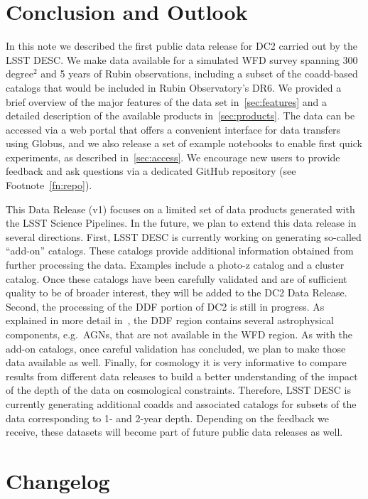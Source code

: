 \documentclass[modern]{descnote}
\begin{document}
\section{Conclusion and Outlook}
\label{sec:outlook}
In this note we described the first public data release for DC2 carried out by the LSST DESC. We make data available for a simulated WFD survey spanning 300 degree$^2$ and 5 years of Rubin observations, including a subset of the coadd-based catalogs that would be included in Rubin Observatory's DR6. We provided a brief overview of the major features of the data set in~\autoref{sec:features} and a detailed description of the available products in~\autoref{sec:products}. The data can be accessed via a web portal that offers a convenient interface for data transfers using Globus, and we also release a set of example notebooks to enable first quick experiments, as described in~\autoref{sec:access}. We encourage new users to provide feedback and ask questions via a dedicated GitHub repository (see Footnote~\ref{fn:repo}).

This Data Release (v1) focuses on a limited set of data products generated with the LSST Science Pipelines. In the future, we plan to extend this data release in several directions. First, LSST DESC is currently working on generating so-called ``add-on'' catalogs. These catalogs provide additional information obtained from further processing the data. Examples include a photo-z catalog and a cluster catalog. Once these catalogs have been carefully validated and are of sufficient quality to be of broader interest, they will be added to the DC2 Data Release. Second, the processing of the DDF portion of DC2 is still in progress. As explained in more detail in~\cite{2020arXiv201005926L}, the DDF region contains several astrophysical components, e.g.~AGNs, that are not available in the WFD region. As with the add-on catalogs, once careful validation has concluded, we plan to make those data available as well. Finally, for cosmology it is very informative to compare results from different data releases to build a better understanding of the impact of the depth of the data on cosmological constraints. Therefore, LSST DESC is currently generating additional coadds and associated catalogs for subsets of the data corresponding to 1- and 2-year depth. Depending on the feedback we receive, these datasets will become part of future public data releases as well.


\clearpage
\appendix
\section{Changelog}

\end{document}
